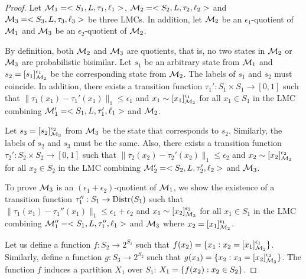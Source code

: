 \lemmaAdditivityProperty*

\begin{proof}
	Let $\mathcal{M}_1 = <S_1, L, \tau_1, \ell_1>$, $\mathcal{M}_2 = <S_2, L, \tau_2, \ell_2>$ and $\mathcal{M}_3 = <S_3, L, \tau_3, \ell_3>$ be three LMCs. In addition, let $\mathcal{M}_2$ be an $\epsilon_1$-quotient of $\mathcal{M}_1$ and $\mathcal{M}_3$ be an $\epsilon_2$-quotient of $\mathcal{M}_2$. 
	
	By definition, both $\mathcal{M}_2$ and $\mathcal{M}_3$ are quotients, that is, no two states in $\mathcal{M}_2$ or $\mathcal{M}_3$ are probabilistic bisimilar. Let $s_1$ be an arbitrary state from $\mathcal{M}_1$ and $s_2 = [s_1]^{\epsilon_1}_{\mathcal{M}_2}$ be the corresponding state from $\mathcal{M}_2$. The labels of $s_1$ and $s_2$ must coincide. In addition, there exists a transition function $\tau_1': S_1 \times S_1 \to [0, 1]$ such that $\|\tau_1(x_1)- \tau_1'(x_1)\|_1 \le \epsilon_1$ and $x_1 \sim [x_1]^{\epsilon_1}_{\mathcal{M}_2}$ for all $x_1 \in S_1$ in the LMC combining $\mathcal{M}_1' = <S_1, L, \tau_1', \ell_1>$ and $\mathcal{M}_2$. 
	
	Let $s_3 = [s_2]^{\epsilon_2}_{\mathcal{M}_3}$ from $\mathcal{M}_3$ be the state that corresponds to $s_2$. Similarly, the labels of $s_2$ and $s_3$ must be the same. Also, there exists a transition function $\tau_2': S_2 \times S_2 \to [0, 1]$ such that $\|\tau_2(x_2) -\tau_2'(x_2)\|_1\le \epsilon_2$ and $x_2 \sim [x_2]^{\epsilon_2}_{\mathcal{M}_3}$ for all $x_2 \in S_2$ in the LMC combining $\mathcal{M}_2' = <S_2, L, \tau_2', \ell_2>$ and $\mathcal{M}_3$.
	
	To prove $\mathcal{M}_3$ is an $(\epsilon_1 + \epsilon_2)$-quotient of $\mathcal{M}_1$, we show the existence of a transition function $\tau_1'': S_1 \to \mathrm{Distr}(S_1)$ such that $\|\tau_1(x_1) -\tau_1''(x_1)\|_1\le \epsilon_1+ \epsilon_2$ and $x_1 \sim [x_2]^{\epsilon_2}_{\mathcal{M}_3}$ for all $x_1 \in S_1$ in the LMC combining $\mathcal{M}_1'' = <S_1, L, \tau_1'', \ell_1>$ and $\mathcal{M}_3$ where $x_2 = [x_1]^{\epsilon_1}_{\mathcal{M}_2}$.
	
	
	Let us define a function $f: S_2 \to 2^{S_1}$ such that $f(x_2) = \{x_1 : x_2 = [x_1]^{\epsilon_1}_{\mathcal{M}_2}\}$. Similarly, define a function $g: S_3 \to 2^{S_2}$ such that $g(x_3) = \{x_2 : x_3 = [x_2]^{\epsilon_2}_{\mathcal{M}_3}\}$. The function $f$ induces a partition $X_1$ over $S_1$: $X_1 = \{ f(x_2) : x_2 \in S_2\}$. 
	

\end{proof}
